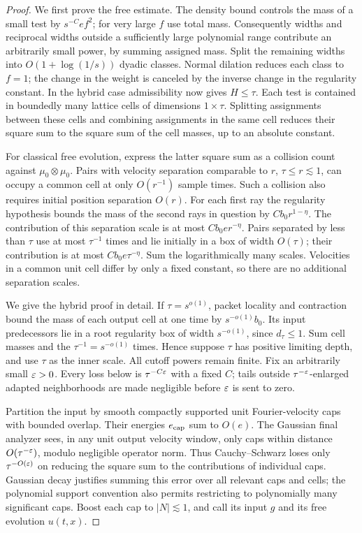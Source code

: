 \begin{proof}
We first prove the free estimate. The density bound controls the mass of
a small test by $s^{-C}ef^2$; for very large $f$ use total mass.
Consequently widths and reciprocal widths outside a sufficiently large
polynomial range contribute an arbitrarily small power, by summing
assigned mass. Split the remaining widths into $O(1+\log(1/s))$ dyadic
classes. Normal dilation reduces each class to $f=1$; the change in the
weight is canceled by the inverse change in the regularity constant.
In the hybrid case admissibility now gives $H\leq\tau$.
Each test is contained in boundedly many lattice cells of dimensions
$1\times\tau$. Splitting assignments between these cells and combining
assignments in the same cell reduces their square sum to the square sum
of the cell masses, up to an absolute constant.

For classical free evolution, express the latter square sum as a
collision count against $\mu_0\otimes\mu_0$. Pairs with velocity
separation comparable to $r$, $\tau\leq r\lesssim1$, can occupy a common
cell at only $O(r^{-1})$ sample times. Such a collision also requires
initial position separation $O(r)$. For each first ray the regularity
hypothesis bounds the mass of the second rays in question by
$Cb_0r^{1-\eta}$. The contribution of this separation scale is at most
$Cb_0er^{-\eta}$. Pairs separated by less than $\tau$ use at most
$\tau^{-1}$ times and lie initially in a box of width $O(\tau)$; their
contribution is at most $Cb_0e\tau^{-\eta}$. Sum the logarithmically many
scales. Velocities in a common unit cell differ by only a fixed constant,
so there are no additional separation scales.

We give the hybrid proof in detail. If $\tau=s^{o(1)}$, packet locality
and contraction bound the mass of each output cell at one time by
$s^{-o(1)}b_0$. Its input predecessors lie in a root regularity box of
width $s^{-o(1)}$, since $d_\tau\leq1$. Sum cell masses and the
$\tau^{-1}=s^{-o(1)}$ times. Hence suppose $\tau$ has positive limiting
depth, and use $\tau$ as the inner scale. All cutoff powers remain finite.
Fix an arbitrarily small $\varepsilon>0$. Every loss below is
$\tau^{-C\varepsilon}$ with a fixed $C$; tails outside $\tau^{-\varepsilon}$-enlarged
adapted neighborhoods are made negligible before $\varepsilon$ is sent to zero.

Partition the input by smooth compactly supported unit Fourier-velocity
caps with bounded overlap. Their energies $e_{\rm cap}$ sum to $O(e)$.
The Gaussian final analyzer sees, in any unit output velocity window,
only caps within distance $O(\tau^{-\varepsilon})$, modulo negligible operator
norm. Thus Cauchy--Schwarz loses only $\tau^{-O(\varepsilon)}$ on reducing the
square sum to the contributions of individual caps. Gaussian decay
justifies summing this error over all relevant caps and cells; the
polynomial support convention also permits restricting to polynomially
many significant caps. Boost each cap to $|N|\lesssim1$, and call its
input $g$ and its free evolution $u(t,x)$.


\end{proof}
